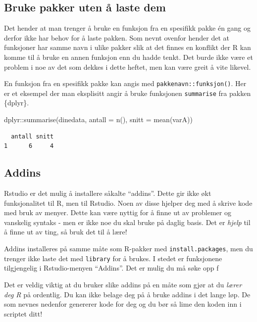 \documentclass[
  letterpaper,
  DIV=11,
  numbers=noendperiod]{scrreprt}
\newenvironment{Shaded}{\begin{snugshade}}{\end{snugshade}}
\newcommand{\AttributeTok}[1]{\textcolor[rgb]{0.40,0.45,0.13}{#1}}
\newcommand{\FunctionTok}[1]{\textcolor[rgb]{0.28,0.35,0.67}{#1}}
\newcommand{\NormalTok}[1]{\textcolor[rgb]{0.00,0.23,0.31}{#1}}
\newcommand{\SpecialCharTok}[1]{\textcolor[rgb]{0.37,0.37,0.37}{#1}}
\theoremstyle{definition}
\theoremstyle{remark}
\begin{document}
\hypertarget{bruke-pakker-uten-uxe5-laste-dem}{%
\subsection{Bruke pakker uten å laste
dem}\label{bruke-pakker-uten-uxe5-laste-dem}}

Det hender at man trenger å bruke en funksjon fra en spesifikk pakke én
gang og derfor ikke har behov for å laste pakken. Som nevnt ovenfor
hender det at funksjoner har samme navn i ulike pakker slik at det
finnes en konflikt der R kan komme til å bruke en annen funksjon enn du
hadde tenkt. Det burde ikke være et problem i noe av det som dekkes i
dette heftet, men kan være greit å vite likevel.

En funksjon fra en spesifikk pakke kan angis med
\texttt{pakkenavn::funksjon()}. Her er et eksempel der man eksplisitt
angir å bruke funksjonen \texttt{summarise} fra pakken \{dplyr\}.

\begin{Shaded}
\begin{Highlighting}[]
\NormalTok{dplyr}\SpecialCharTok{::}\FunctionTok{summarise}\NormalTok{(dinedata, }\AttributeTok{antall =} \FunctionTok{n}\NormalTok{(), }\AttributeTok{snitt =} \FunctionTok{mean}\NormalTok{(varA))}
\end{Highlighting}
\end{Shaded}

\begin{verbatim}
  antall snitt
1      6     4
\end{verbatim}

\hypertarget{addins}{%
\subsection{Addins}\label{addins}}

Rstudio er det mulig å installere såkalte ``addins''. Dette gir ikke økt
funksjonalitet til R, men til Rstudio. Noen av disse hjelper deg med å
skrive kode med bruk av menyer. Dette kan være nyttig for å finne ut av
problemer og vanskelig syntaks - men er ikke noe du skal bruke på daglig
basis. Det er \emph{hjelp} til å finne ut av ting, så bruk det til å
lære!

Addins installeres på samme måte som R-pakker med
\texttt{install.packages}, men du trenger ikke laste det med
\texttt{library} for å brukes. I stedet er funksjonene tilgjengelig i
Rstudio-menyen ``Addins''. Det er mulig du må søke opp f

Det er veldig viktig at du bruker slike addins på en måte som gjør at du
\emph{lærer deg R} på ordentlig. Du kan ikke belage deg på å bruke
addins i det lange løp. De som nevnes nedenfor genererer kode for deg og
du bør så lime den koden inn i scriptet ditt!
\end{document}
